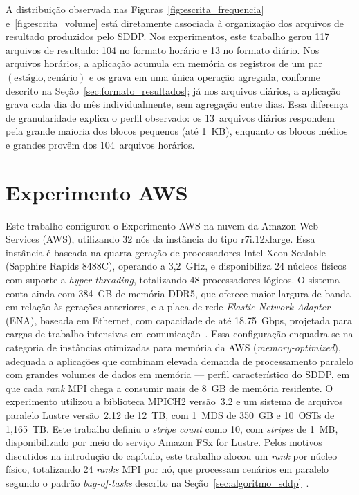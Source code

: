 A distribuição observada nas Figuras~\ref{fig:escrita_frequencia}
e~\ref{fig:escrita_volume} está diretamente associada à organização dos
arquivos de resultado produzidos pelo SDDP. Nos experimentos, este
trabalho gerou 117 arquivos de resultado: 104 no formato horário e 13 no
formato diário. Nos arquivos horários, a aplicação acumula em memória os
registros de um par $(\text{estágio}, \text{cenário})$ e os grava em uma
única operação agregada, conforme descrito na
Seção~\ref{sec:formato_resultados}; já nos arquivos diários, a aplicação
grava cada dia do mês individualmente, sem agregação entre dias. Essa
diferença de granularidade explica o perfil observado: os 13~arquivos
diários respondem pela grande maioria dos blocos pequenos (até 1~KB),
enquanto os blocos médios e grandes provêm dos 104~arquivos horários.

\section{Experimento AWS}
\label{sec:exp_aws}

Este trabalho configurou o Experimento AWS na nuvem da Amazon Web Services
(AWS), utilizando 32 nós da instância do tipo r7i.12xlarge. Essa instância é
baseada na quarta geração de processadores Intel Xeon Scalable (Sapphire
Rapids 8488C), operando a 3,2~GHz, e disponibiliza 24 núcleos físicos com
suporte a \textit{hyper-threading}, totalizando 48 processadores lógicos.
O sistema conta ainda com 384~GB de memória DDR5, que oferece maior
largura de banda em relação às gerações anteriores, e a placa de rede
\textit{Elastic Network Adapter} (ENA), baseada em Ethernet, com
capacidade de até 18,75~Gbps, projetada para cargas de trabalho
intensivas em comunicação~\cite{aws:ena}. Essa configuração enquadra-se na
categoria de instâncias otimizadas para memória da AWS
(\textit{memory-optimized}), adequada a aplicações que combinam elevada
demanda de processamento paralelo com grandes volumes de dados em
memória --- perfil característico do SDDP, em que cada \textit{rank} MPI
chega a consumir mais de 8~GB de memória residente. O experimento utilizou a biblioteca MPICH2 versão~3.2 e um sistema de
arquivos paralelo Lustre versão~2.12 de 12~TB, com 1~MDS de 350~GB e
10~OSTs de 1,165~TB. Este trabalho definiu o \textit{stripe count} como 10, com
\textit{stripes} de 1~MB, disponibilizado por meio do serviço
Amazon FSx for Lustre. Pelos motivos discutidos na introdução do
capítulo, este trabalho alocou um \textit{rank} por núcleo físico,
totalizando
24 \textit{ranks} MPI por nó, que processam cenários em paralelo
segundo o padrão \textit{bag-of-tasks} descrito na
Seção~\ref{sec:algoritmo_sddp}~\cite{intel:23,aws:24}.


